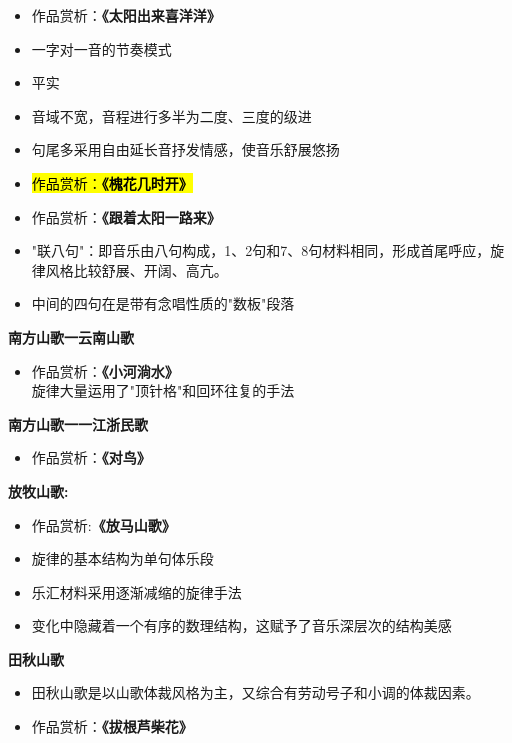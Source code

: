 \documentclass[
]{article}
\providecommand{\tightlist}{%
  \setlength{\itemsep}{0pt}\setlength{\parskip}{0pt}}
\begin{document}
\begin{itemize}
\item
  作品赏析：\textbf{《太阳出来喜洋洋》}
\item
  一字对一音的节奏模式
\item
  平实
\item
  音域不宽，音程进行多半为二度、三度的级进
\item
  句尾多采用自由延长音抒发情感，使音乐舒展悠扬
\item
  \hl{\mbox{作品赏析：\textbf{《槐花几时开》}}}
\item
  作品赏析：\textbf{《跟着太阳一路来》}
\item
  "联八句"：即音乐由八句构成，1、2句和7、8句材料相同，形成首尾呼应，旋律风格比较舒展、开阔、高亢。
\item
  中间的四句在是带有念唱性质的"数板"段落
\end{itemize}

\textbf{南方山歌一云南山歌}

\begin{itemize}
\tightlist
\item
  作品赏析：\textbf{《小河淌水》}\\
  旋律大量运用了"顶针格"和回环往复的手法
\end{itemize}

\textbf{南方山歌一一江浙民歌}

\begin{itemize}
\tightlist
\item
  作品赏析：\textbf{《对鸟》}
\end{itemize}

\textbf{放牧山歌:}

\begin{itemize}
\tightlist
\item
  作品赏析:\textbf{《放马山歌》}
\item
  旋律的基本结构为单句体乐段
\item
  乐汇材料采用逐渐减缩的旋律手法
\item
  变化中隐藏着一个有序的数理结构，这赋予了音乐深层次的结构美感
\end{itemize}

\textbf{田秋山歌}

\begin{itemize}
\tightlist
\item
  田秋山歌是以山歌体裁风格为主，又综合有劳动号子和小调的体裁因素。
\item
  作品赏析：\textbf{《拔根芦柴花》}
\end{itemize}
\end{document}
